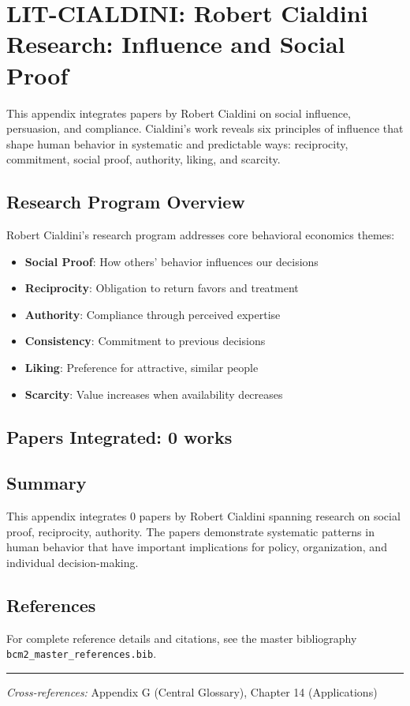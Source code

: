 \section{LIT-CIALDINI: Robert Cialdini Research: Influence and Social Proof}
\label{app:lity}

This appendix integrates papers by Robert Cialdini on social influence,
persuasion, and compliance. Cialdini's work reveals six principles of influence that shape
human behavior in systematic and predictable ways: reciprocity, commitment, social proof,
authority, liking, and scarcity.

\subsection{Research Program Overview}

Robert Cialdini's research program addresses core behavioral economics themes:

\begin{itemize}
  \item \textbf{Social Proof}: How others' behavior influences our decisions
  \item \textbf{Reciprocity}: Obligation to return favors and treatment
  \item \textbf{Authority}: Compliance through perceived expertise
  \item \textbf{Consistency}: Commitment to previous decisions
  \item \textbf{Liking}: Preference for attractive, similar people
  \item \textbf{Scarcity}: Value increases when availability decreases
\end{itemize}

\subsection{Papers Integrated: 0 works}

\subsection{Summary}

This appendix integrates 0 papers by Robert Cialdini
spanning research on social proof, reciprocity, authority.
The papers demonstrate systematic patterns in human behavior that have important
implications for policy, organization, and individual decision-making.

\subsection{References}

For complete reference details and citations, see the master bibliography
\texttt{bcm2\_master\_references.bib}.

\vspace{1em}
\hrule
\vspace{0.5em}

\noindent\textit{Cross-references:}
Appendix G (Central Glossary), Chapter 14 (Applications)

